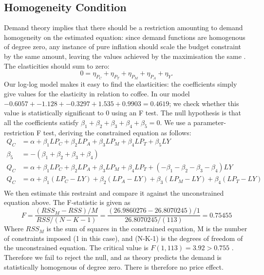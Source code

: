 \documentclass[12pt]{article}
\begin{document}
\subsection{Homogeneity Condition} %
\label{sub:equation_restrictions}
Demand theory implies that there should be a restriction amounting to demand homogeneity on the estimated equation: since demand functions are homogenous of degree zero, any instance of pure inflation should scale the budget constraint by the same amount, leaving the values achieved by the maximisation the same \cite[154]{snyderMicroeconomicTheoryBasic2012}.  The elasticities should sum to zero:
\[
0 = \eta_{P_C} + \eta_{P_T} + \eta_{P_M} + \eta_{P_A} + \eta_{Y}.
\]
Our log-log model makes it easy to find the elasticities: the coefficients simply give values for the elasticity in relation to coffee. In our model \(-0.6057 + -1.128 + -0.3297 + 1.535 + 0.9903 = 0.4619\); we check whether this value is statistically significant to 0 using an F test. 
The null hypothesis is that all the coefficients satisfy \(\beta_1+\beta_2+\beta_3+\beta_4+\beta_5 = 0\).
We use a parameter-restriction F test, deriving the constrained equation as follows:
\begin{align*}
	Q_C    &= \alpha + \beta_1 LP_C +\beta_2 LP_A +\beta_3 LP_M +\beta_4 LP_T +\beta_5 LY \\
	\beta_5 &= -(\beta_1+\beta_2+\beta_3+\beta_4)\\
	Q_C     &= \alpha + \beta_1 LP_C +\beta_2 LP_A +\beta_3 LP_M +\beta_4 LP_T +(-\beta_1-\beta_2-\beta_3-\beta_4) LY\\
	Q_C     &= \alpha +  \beta_1 (LP_C - LY)+ \beta_2 (LP_A- LY) +\beta_3 (LP_M- LY) +\beta_4 (LP_T- LY)\\
\end{align*}
We then estimate this restraint and compare it against the unconstrained equation above. The F-statistic is given as 
\[
F = \frac{(RSS_M-RSS)/M}{RSS/(N-K-1)} = \frac{(26.9860276-26.8070245)/1}{26.8070245/(113)} = 0.75455
\]
Where \(RSS_M\) is the sum of squares in the constrained equation, M is the number of constraints imposed (1 in this case), and (N-K-1) is the degrees of freedom of the unconstrained equation. The critical value is \(F(1,113) = 3.92 > 0.755\) . Therefore we fail to reject the null, and as theory predicts the demand is statistically homogenous of degree zero. There is therefore no price effect.
\end{document}
